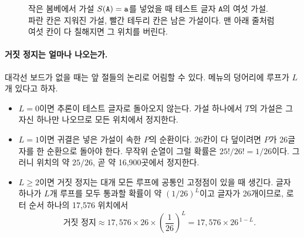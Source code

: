 \begin{figure}[ht]
\centering
{}
\caption{작은 봄베에서 가설 $S(\mathtt{A}) = \mathtt{a}$를 넣었을 때 테스트 글자 \texttt{A}의 여섯 가설. 파란 칸은
지워진 가설, 빨간 테두리 칸은 남은 가설이다. 맨 아래 줄처럼 여섯 칸이 다 칠해지면 그 위치를 버린다.}
\label{fig:ac-register}
\end{figure}

\paragraph{거짓 정지는 얼마나 나오는가.} 대각선 보드가 없을 때는 앞 절들의 논리로 어림할 수 있다. 메뉴의 덩어리에
루프가 $L$개 있다고 하자.

\begin{itemize}
\item $L = 0$이면 추론이 테스트 글자로 돌아오지 않는다. 가설 하나에서 $T$의 가설은 그 자신 하나만 나오므로 모든 위치에서
정지한다.
\item $L = 1$이면 귀결은 넣은 가설이 속한 $P$의 순환이다. 26칸이 다 덮이려면 $P$가 26글자를 한 순환으로 돌아야 한다.
무작위 순열이 그럴 확률은 $25!/26! = 1/26$이다. 그러니 위치의 약 $25/26$, 곧 약 16,900곳에서 정지한다.
\item $L \geq 2$이면 거짓 정지는 대개 모든 루프에 공통인 고정점이 있을 때 생긴다. 글자 하나가 $L$개 루프를 모두 통과할
확률이 약 $(1/26)^L$이고 글자가 26개이므로, 로터 순서 하나의 17,576 위치에서
\begin{equation}
  \text{거짓 정지} \approx 17{,}576 \times 26 \times \left(\frac{1}{26}\right)^{L} = 17{,}576 \times 26^{\,1-L}. \label{eq:ac-falsestop}
\end{equation}
\end{itemize}

